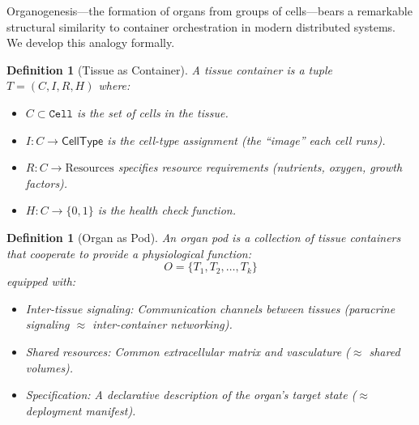\documentclass[12pt,a4paper]{article}
\newtheorem{definition}[theorem]{Definition}
\begin{document}
Organogenesis---the formation of organs from groups of cells---bears
a remarkable structural similarity to container orchestration in
modern distributed systems.  We develop this analogy formally.

\begin{definition}[Tissue as Container]\label{def:tissue-container}
A \emph{tissue container} is a tuple $T = (C, I, R, H)$ where:
\begin{itemize}
  \item $C \subset \texttt{Cell}$ is the set of cells in the tissue.
  \item $I : C \to \mathsf{CellType}$ is the cell-type assignment
    (the ``image'' each cell runs).
  \item $R : C \to \text{Resources}$ specifies resource requirements
    (nutrients, oxygen, growth factors).
  \item $H : C \to \{0,1\}$ is the health check function.
\end{itemize}
\end{definition}

\begin{definition}[Organ as Pod]\label{def:organ-pod}
An \emph{organ pod} is a collection of tissue containers that
cooperate to provide a physiological function:
\[
  O = \{T_1, T_2, \ldots, T_k\}
\]
equipped with:
\begin{itemize}
  \item \emph{Inter-tissue signaling}: Communication channels
    between tissues (paracrine signaling $\approx$ inter-container
    networking).
  \item \emph{Shared resources}: Common extracellular matrix and
    vasculature ($\approx$ shared volumes).
  \item \emph{Specification}: A declarative description of the
    organ's target state ($\approx$ deployment manifest).
\end{itemize}
\end{definition}
\end{document}
